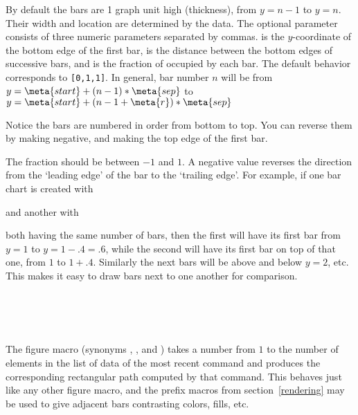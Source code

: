 \documentclass[letterpaper]{article}
\begin{document}
By default the bars are 1 graph unit high (thickness), from $y = n-1$ to
$y = n$. Their width and location are determined by the data. The
optional parameter consists of three numeric parameters separated by
commas.  is the $y$-coordinate of the bottom edge of the
first bar,  is the distance between the  bottom edges of
successive bars, and  is the fraction of  occupied by
each bar. The default behavior corresponds to \texttt{[0,1,1]}. In
general, bar number $n$ will be from $y = \meta{start} +
(n-1)*\meta{sep}$ to $y = \meta{start} + (n-1 + \meta{r})*\meta{sep}$

Notice the bars are numbered in order from bottom to top. You can
reverse them by making  negative, and making  the
top edge of the first bar.

The fraction   should be between $-1$ and $1$. A negative value
reverses the direction from the `leading edge' of the bar to the
`trailing edge'. For example, if one bar chart is created with
\begin{ex}
  \marg{$\ldots$}
\end{ex}
and another with
\begin{ex}
  \marg{$\ldots$}
\end{ex}
both having the same number of bars, then the first will have its first
bar from $y = 1$ to $y = 1 -.4 = .6$, while the second will have its
first bar on top of that one, from $1$ to $1 + .4$. Similarly the next
bars will be above and below $y=2$, etc. This makes it easy to draw bars
next to one another for comparison.

\begin{cd}
\\
\\
\\
%
%
%
%
%
\end{cd}

The figure macro  (synonyms , ,
and ) takes a number from $1$ to the number of elements in
the list of data of the most recent  command and produces
the corresponding rectangular path computed by that command. This
behaves just like any other figure macro, and the prefix macros from
section~\ref{rendering} may be used to give adjacent bars contrasting
colors, fills, etc.
\end{document}
